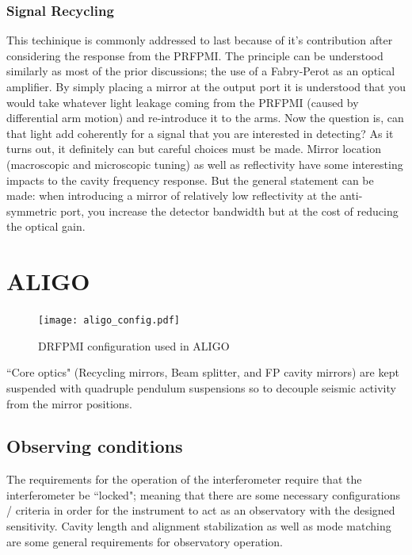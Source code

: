 \subsubsection{Signal Recycling}
This techinique is commonly addressed to last because of it's contribution after considering the response from the PRFPMI. The principle can be understood similarly as most of the prior discussions; the use of a Fabry-Perot as an optical amplifier. By simply placing a mirror at the output port it is understood that you would take whatever light leakage coming from the PRFPMI (caused by differential arm motion) and re-introduce it to the arms. Now the question is, can that light add coherently for a signal that you are interested in detecting? As it turns out, it definitely can but careful choices must be made. Mirror location (macroscopic and microscopic tuning) as well as reflectivity have some interesting impacts to the cavity frequency response. But the general statement can be made: when introducing a mirror of relatively low reflectivity at the anti-symmetric port, you increase the detector bandwidth but at the cost of reducing the optical gain.


\section{ALIGO}

\begin{figure}[H]
  \begin{center}
	  \texttt{[image: aligo\_config.pdf]}
  \end{center}
  \caption{DRFPMI configuration used in ALIGO}
  \label{fig:simple_michelson}
\end{figure}

``Core optics" (Recycling mirrors, Beam splitter, and FP cavity mirrors) are kept suspended with quadruple pendulum suspensions so to decouple seismic activity from the mirror positions.

\subsection{Observing conditions}
The requirements for the operation of the interferometer require that the interferometer be  ``locked"; meaning that there are some necessary configurations / criteria in order for the instrument to act as an observatory with the designed sensitivity. Cavity length and alignment stabilization as well as mode matching are some general requirements for observatory operation.

